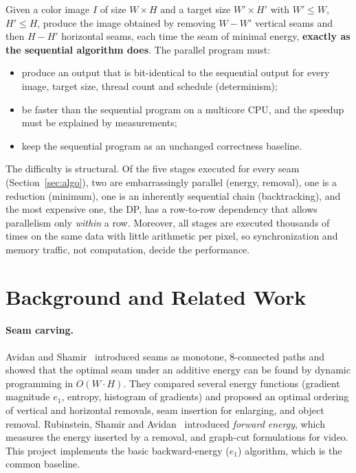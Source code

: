\documentclass[11pt,a4paper]{article}
\begin{document}
Given a color image $I$ of size $W\times H$ and a target size $W'\times H'$ with $W'\le W$, $H'\le H$,
produce the image obtained by removing $W-W'$ vertical seams and then $H-H'$ horizontal seams, each time
the seam of minimal energy, \textbf{exactly as the sequential algorithm does}. The parallel program must:
\begin{itemize}
  \item produce an output that is bit-identical to the sequential output for every image, target size,
        thread count and schedule (determinism);
  \item be faster than the sequential program on a multicore CPU, and the speedup must be explained by
        measurements;
  \item keep the sequential program as an unchanged correctness baseline.
\end{itemize}

The difficulty is structural. Of the five stages executed for every seam (Section~\ref{sec:algo}), two are
embarrassingly parallel (energy, removal), one is a reduction (minimum), one is an inherently sequential
chain (backtracking), and the most expensive one, the DP, has a row-to-row dependency that allows
parallelism only \emph{within} a row. Moreover, all stages are executed thousands of times on the same
data with little arithmetic per pixel, so synchronization and memory traffic, not computation, decide the
performance.

\section{Background and Related Work}

\paragraph{Seam carving.} Avidan and Shamir~\cite{avidan2007} introduced seams as monotone, 8-connected
paths and showed that the optimal seam under an additive energy can be found by dynamic programming in
$O(W\cdot H)$. They compared several energy functions (gradient magnitude $e_1$, entropy, histogram of
gradients) and proposed an optimal ordering of vertical and horizontal removals, seam insertion for
enlarging, and object removal. Rubinstein, Shamir and Avidan~\cite{rubinstein2008} introduced
\emph{forward energy}, which measures the energy inserted by a removal, and graph-cut formulations for
video. This project implements the basic backward-energy ($e_1$) algorithm, which is the common baseline.
\end{document}
